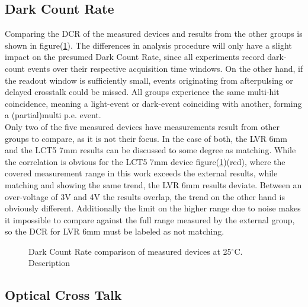 \documentclass[12pt,article,type=msc,colorback,accentcolor=tud9c]{tudthesis}
\begin{document}
\subsection{Dark Count Rate}
\label{subsec:DC_DCR}

Comparing the DCR of the measured devices and results from the other groups is shown in figure(\ref{fig:DC_DCR}). The differences in analysis procedure will only have a slight impact on the presumed Dark Count Rate, since all experiments record dark-count events over their respective acquisition time windows. On the other hand, if the readout window is sufficiently small, events originating from afterpulsing or delayed crosstalk could be missed. All groups experience the same multi-hit coincidence, meaning a light-event or dark-event coinciding with another, forming a (partial)multi p.e. event.\\
Only two of the five measured devices have measurements result from other groups to compare, as it is not their focus. In the case of both, the LVR 6mm and the LCT5 7mm results can be discussed to some degree as matching. While the correlation is obvious for the LCT5 7mm device figure(\ref{fig:DC_DCR})(red), where the covered measurement range in this work exceeds the  external results, while matching and showing the same trend, the LVR 6mm results deviate. Between an over-voltage of 3V and 4V the results overlap, the trend on the other hand is obviously different. Additionally the limit on the higher range due to noise makes it impossible to compare against the full range measured by the external group, so the DCR for LVR 6mm must be labeled as not matching. 

\begin{figure}%
\begin{centering}
\caption[DCR device comparison]{Dark Count Rate comparison of measured devices at 25$^\circ$C. Description}
\label{fig:DC_DCR}
\end{centering}
\end{figure}

\subsection{Optical Cross Talk}
\label{subsec:DC_OCT}
\end{document}
